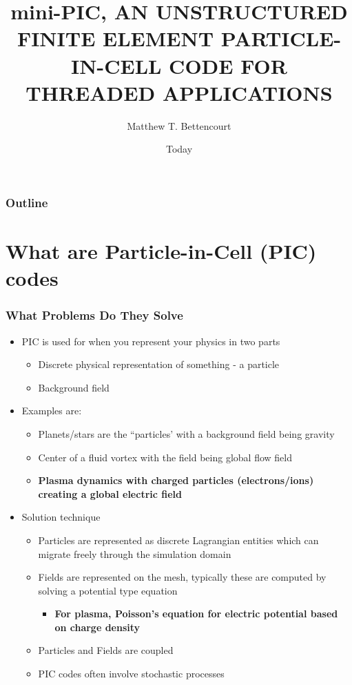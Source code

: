 \documentclass[t]{beamer}
\title{{mini-PIC}, AN UNSTRUCTURED FINITE ELEMENT PARTICLE-IN-CELL
  CODE FOR THREADED APPLICATIONS}
\author{Matthew T. Bettencourt}
\institute{Sandia National Laboratories}
\date{Today}
\begin{document}


\begin{frame}
  \titlepage
\end{frame}


\begin{frame}
  \frametitle{Outline}
  {\small\tableofcontents[hideallsubsections]}
\end{frame}


\section{What are Particle-in-Cell {(PIC)} codes}

\begin{frame}
 \frametitle{What Problems Do They Solve}
  \begin{itemize}
  \item PIC is used for when you represent your physics in two parts
  \begin{itemize}
    \item Discrete physical representation of something - a particle
    \item Background field
  \end{itemize}
  \item Examples are:
  \begin{itemize}
  \item Planets/stars are the ``particles' with a background field
    being gravity
  \item Center of a fluid vortex with the field being global flow field
  \item {\bf{Plasma dynamics with charged particles (electrons/ions)
    creating a global electric field}}
  \end{itemize}
  \item Solution technique
  \begin{itemize}
  \item Particles are represented as discrete Lagrangian entities
    which can migrate freely through the simulation domain
  \item Fields are represented on the mesh, typically these are
    computed by solving a potential type equation
  \begin{itemize}
    \item {\bf{For plasma, Poisson's equation for electric potential
      based on charge density} }
  \end{itemize}

  \item Particles and Fields are coupled 
  \item PIC codes often involve stochastic processes
  \end{itemize}
  \end{itemize}
\end{frame}
\end{document}
